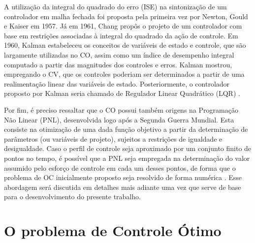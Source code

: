 A utilização da integral do quadrado do erro (ISE) na sintonização de um controlador em malha fechada foi proposta pela primeira vez por Newton, Gould e Kaiser em 1957. Já em 1961, Chang propôs o projeto de um controlador com base em restrições associadas à integral do quadrado da ação de controle. Em 1960, Kalman estabeleceu os conceitos de variáveis de estado e controle, que são largamente utilizadas no CO, assim como um índice de desempenho integral computado a partir das magnitudes dos controles e erros. Kalman mostrou, empregando o CV, que os controles poderiam ser determinados a partir de uma realimentação linear das variáveis de estado. Posteriormente, o controlador proposto por Kalman seria chamado de Regulador Linear Quadrático (LQR) \cite{bryson_optimal_1996}. 

Por fim, é preciso ressaltar que o CO possui também origens na Programação Não Linear (PNL), desenvolvida logo após a Segunda Guerra Mundial. Esta consiste na otimização de uma dada função objetivo a partir da determinação de parâmetros (ou variáveis de projeto), sujeitos a restrições de igualdade e desigualdade. Caso o perfil de controle seja aproximado por um conjunto finito de pontos no tempo, é possível que a PNL seja empregada na determinação do valor assumido pelo esforço de controle em cada um desses pontos, de forma que o problema de OC inicialmente proposto seja resolvido de forma numérica \cite{bryson_optimal_1996}. Esse abordagem será discutida em detalhes mais adiante uma vez que serve de base para o desenvolvimento do presente trabalho.  

\section{O problema de Controle Ótimo}

%

